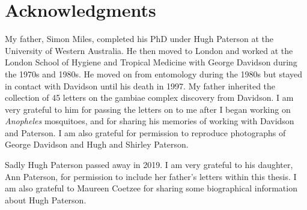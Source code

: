 \documentclass[a4paper,11pt,abstracton,hidelinks]{scrartcl}
\begin{document}
\section{Acknowledgments}\label{sec:acknowledgments}


My father, Simon Miles, completed his PhD under Hugh Paterson at the University of Western Australia. 
%
He then moved to London and worked at the London School of Hygiene and Tropical Medicine with George Davidson during the 1970s and 1980s. 
%
He moved on from entomology during the 1980s but stayed in contact with Davidson until his death in 1997.
%
My father inherited the collection of 45 letters on the gambiae complex discovery from Davidson. 
%
I am very grateful to him for passing the letters on to me after I began working on \textit{Anopheles} mosquitoes, and for sharing his memories of working with Davidson and Paterson.
%
I am also grateful for permission to reproduce photographs of George Davidson and Hugh and Shirley Paterson.


Sadly Hugh Paterson passed away in 2019.
%
I am very grateful to his daughter, Ann Paterson, for permission to include her father's letters within this thesis.
%
I am also grateful to Maureen Coetzee for sharing some biographical information about Hugh Paterson.
%


\printbibliography
\end{document}
